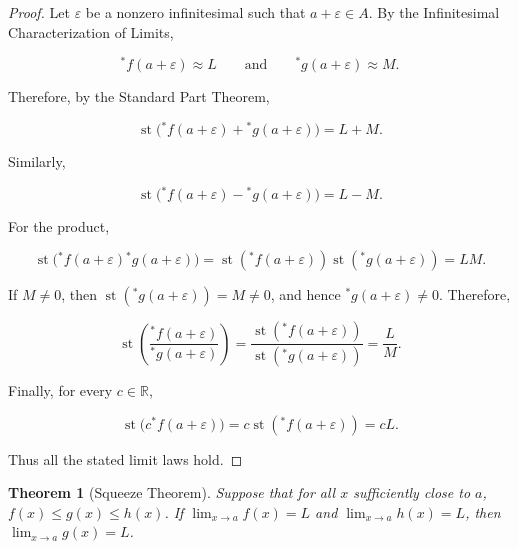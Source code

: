 \documentclass[10pt,a4paper]{book}
\newtheorem{theorem}{Theorem}[section]
\begin{document}
\begin{proof}

    Let $\varepsilon$ be a nonzero infinitesimal such that $a+\varepsilon\in A$. By
    the Infinitesimal Characterization of Limits,

    $$
        {}^*f(a+\varepsilon)\approx L
        \qquad\text{and}\qquad
        {}^*g(a+\varepsilon)\approx M.
    $$

    Therefore, by the Standard Part Theorem,

    $$
        \operatorname{st}\bigl({}^*f(a+\varepsilon)+{}^*g(a+\varepsilon)\bigr)
        =L+M.
    $$

    Similarly,

    $$
        \operatorname{st}\bigl({}^*f(a+\varepsilon)-{}^*g(a+\varepsilon)\bigr)
        =L-M.
    $$

    For the product,

    $$
        \operatorname{st}\bigl({}^*f(a+\varepsilon){}^*g(a+\varepsilon)\bigr)
        =
        \operatorname{st}({}^*f(a+\varepsilon))
        \operatorname{st}({}^*g(a+\varepsilon))
        =LM.
    $$

    If $M\neq0$, then $\operatorname{st}({}^*g(a+\varepsilon))=M\neq0$, and hence
    ${}^*g(a+\varepsilon)\neq0$. Therefore,

    $$
        \operatorname{st}\left(
        \frac{{}^*f(a+\varepsilon)}
        {{}^*g(a+\varepsilon)}
        \right)
        =
        \frac{\operatorname{st}({}^*f(a+\varepsilon))}
        {\operatorname{st}({}^*g(a+\varepsilon))}
        =
        \frac{L}{M}.
    $$

    Finally, for every $c\in\mathbb{R}$,

    $$
        \operatorname{st}\bigl(c{}^*f(a+\varepsilon)\bigr)
        =
        c\operatorname{st}({}^*f(a+\varepsilon))
        =cL.
    $$

    Thus all the stated limit laws hold.

\end{proof}

\begin{theorem}[Squeeze Theorem]

    Suppose that for all $x$ sufficiently close to $a$, $f(x)\leq g(x)\leq h(x)$.
    If $\lim_{x\to a}f(x)=L$ and $\lim_{x\to a}h(x)=L$, then $\lim_{x\to a}g(x)=L$.

\end{theorem}
\end{document}
